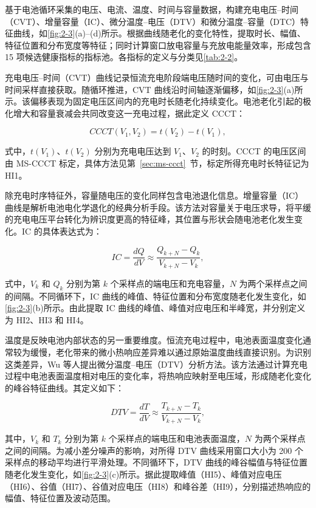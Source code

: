基于电池循环采集的电压、电流、温度、时间与容量数据，构建充电电压–时间（CVT）、增量容量（IC）、微分温度–电压（DTV）和微分温度–容量（DTC）特征曲线，如\cref{fig:2-3}(a)--(d)所示。根据曲线随老化的变化特性，提取时长、幅值、特征位置和分布宽度等特征；同时计算窗口放电容量与充放电能量效率，形成包含 15 项候选健康指标的指标池\cite{ref52,ref63,ref64,ref65}。各指标的定义与分类见\cref{tab:2-2}。



充电电压–时间（CVT）曲线记录恒流充电阶段端电压随时间的变化，可由电压与时间采样直接获取。随循环推进，CVT 曲线沿时间轴逐渐偏移，如\cref{fig:2-3}(a)所示。该偏移表现为固定电压区间内的充电时长随老化持续变化。电池老化引起的极化增大和容量衰减会共同改变这一充电过程\cite{ref63,ref64}，据此定义 CCCT：

\begin{equation}
CCCT(V_1,V_2)=t(V_2)-t(V_1),
\end{equation}

式中，$t(V_1)$、$t(V_2)$ 分别为充电电压达到 $V_1$、$V_2$ 的时刻。CCCT 的电压区间由 MS-CCCT 标定，具体方法见第~\ref{sec:ms-ccct}~节，标定所得充电时长特征记为 HI1。

除充电时序特征外，容量随电压的变化同样包含电池退化信息。增量容量（IC）曲线是解析电池电化学退化的经典分析手段。该方法对容量关于电压求导，将平缓的充电电压平台转化为辨识度更高的特征峰，其位置与形状会随电池老化发生变化\cite{ref50,ref64}。IC 的具体表达式为：

\begin{equation}
IC=\frac{dQ}{dV}\approx\frac{Q_{k+N}-Q_k}{V_{k+N}-V_k},
\end{equation}

式中，$V_k$ 和 $Q_k$ 分别为第 $k$ 个采样点的端电压和充电容量，$N$ 为两个采样点之间的间隔。不同循环下，IC 曲线的峰值、特征位置和分布宽度随老化发生变化，如\cref{fig:2-3}(b)所示。由此提取 IC 曲线的峰值、峰值对应电压和半峰宽，并分别定义为 HI2、HI3 和 HI4。

温度是反映电池内部状态的另一重要维度。恒流充电过程中，电池表面温度变化通常较为缓慢，老化带来的微小热响应差异难以通过原始温度曲线直接识别。为识别这类差异，Wu 等人\cite{ref65}提出微分温度–电压（DTV）分析方法。该方法通过计算充电过程中电池表面温度相对电压的变化率，将热响应映射至电压域，形成随老化变化的峰谷特征曲线\cite{ref64,ref65}。其定义如下：

\begin{equation}
DTV=\frac{dT}{dV}\approx\frac{T_{k+N}-T_k}{V_{k+N}-V_k},
\end{equation}

其中，$V_k$ 和 $T_k$ 分别为第 $k$ 个采样点的端电压和电池表面温度，$N$ 为两个采样点之间的间隔。为减小差分噪声的影响，对所得 DTV 曲线采用窗口大小为 200 个采样点的移动平均进行平滑处理\cite{ref64}。不同循环下，DTV 曲线的峰谷幅值与特征位置随老化发生变化，如\cref{fig:2-3}(c)所示。据此提取峰值（HI5）、峰值对应电压（HI6）、谷值（HI7）、谷值对应电压（HI8）和峰谷差（HI9），分别描述热响应的幅值、特征位置及波动范围\cite{ref64}。

